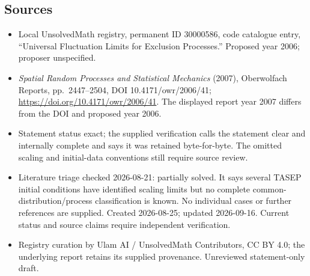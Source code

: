 \documentclass[11pt]{article}
\begin{document}
\subsection{Sources}
\begin{itemize}
\item Local UnsolvedMath registry, permanent ID 30000586, code catalogue entry, ``Universal Fluctuation Limits for Exclusion Processes.'' Proposed year 2006; proposer unspecified.
\item \emph{Spatial Random Processes and Statistical Mechanics} (2007), Oberwolfach Reports, pp.\ 2447--2504, DOI 10.4171/owr/2006/41; \url{https://doi.org/10.4171/owr/2006/41}. The displayed report year 2007 differs from the DOI and proposed year 2006.
\item Statement status exact; the supplied verification calls the statement clear and internally complete and says it was retained byte-for-byte. The omitted scaling and initial-data conventions still require source review.
\item Literature triage checked 2026-08-21: partially solved. It says several TASEP initial conditions have identified scaling limits but no complete common-distribution/process classification is known. No individual cases or further references are supplied. Created 2026-08-25; updated 2026-09-16. Current status and source claims require independent verification.
\item Registry curation by Ulam AI / UnsolvedMath Contributors, CC BY 4.0; the underlying report retains its supplied provenance. Unreviewed statement-only draft.
\end{itemize}
\end{document}
